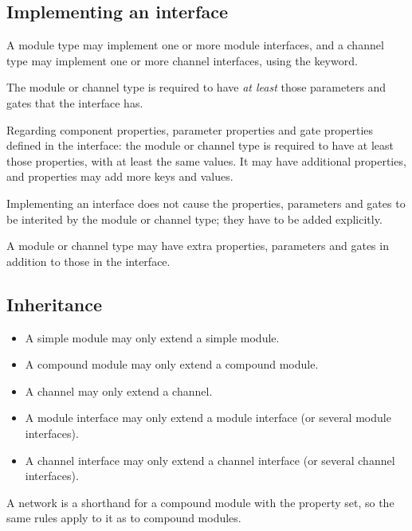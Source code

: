 \subsection{Implementing an interface}
\label{ch-ned-ref:sec:implementing-an-interface}

A module type may implement one or more module interfaces, and a channel type
may implement one or more channel interfaces, using the 
keyword.

The module or channel type is required to have \textit{at least} those
parameters and gates that the interface has.

Regarding component properties, parameter properties and gate properties
defined in the interface: the module or channel type is required to have at
least those properties, with at least the same values. It may have
additional properties, and properties may add more keys and values.

\begin{note}
  Implementing an interface does not cause the properties, parameters and
  gates to be interited by the module or channel type; they have to be added
  explicitly.
\end{note}

\begin{note}
  A module or channel type may have extra properties, parameters and gates
  in addition to those in the interface.
\end{note}



\subsection{Inheritance}
\label{ch-ned-ref:sec:inheritance}

\begin{itemize}
  \item A simple module may only extend a simple module.
  \item A compound module may only extend a compound module.
  \item A channel may only extend a channel.
  \item A module interface may only extend a module interface (or several module
        interfaces).
  \item A channel interface may only extend a channel interface (or several
        channel interfaces).
\end{itemize}

A network is a shorthand for a compound module with the 
property set, so the same rules apply to it as to compound modules.

